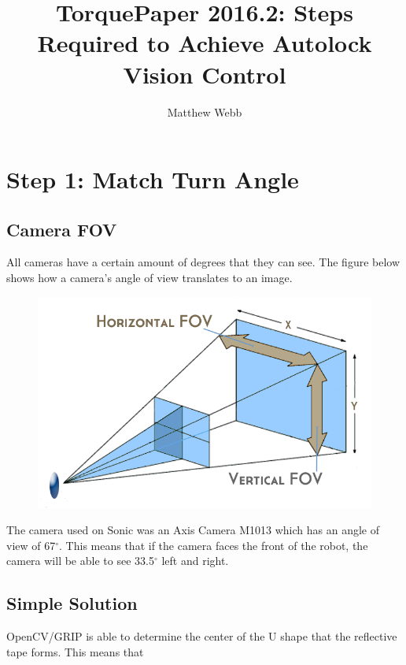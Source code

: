 \documentclass[a4paper,12pt]{report}
\author{Matthew Webb}
\title{TorquePaper 2016.2: Steps Required to Achieve Autolock Vision Control}
\newcommand{\tab}{\hspace{20pt}}
\begin{document}
	\maketitle
	\tableofcontents
	
	\chapter{Step 1: Match Turn Angle}
	\section{Camera FOV}
	\tab All cameras have a certain amount of degrees that they can see. The figure below shows how a camera's angle of view translates to an image.
	
	\begin{figure}[h]
		\centering
		\includegraphics[scale=.3]{camerafov.png}
	\end{figure}
	
	\tab The camera used on Sonic was an Axis Camera M1013 which has an angle of view of 67$^{\circ}$. This means that if the camera faces the front of the robot, the camera will be able to see 33.5$^{\circ}$ left and right.
	\section{Simple Solution}
	\tab OpenCV/GRIP is able to determine the center of the U shape that the reflective tape forms. This means that 
\end{document}
